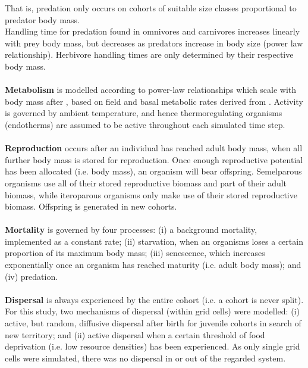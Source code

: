 That is, predation only occurs on cohorts of suitable size classes proportional to predator body mass.
\\
 Handling time for predation found in omnivores and carnivores increases linearly with prey body mass, but decreases as predators increase in body size (power law relationship). Herbivore handling times are only determined by their respective body mass. \\\\
\textbf{Metabolism} is modelled according to  power-law relationships which scale with body mass after \cite{Brown2004}, based on field and basal metabolic rates derived from \cite{Nagy1999}. 
 Activity is governed by ambient temperature, and hence thermoregulating organisms (endotherms) are assumed to be active throughout each simulated time step. 
\\\\
\textbf{Reproduction} occurs after an individual has reached adult body mass, when all further body mass is stored for reproduction. 
Once enough reproductive potential has been allocated (i.e. body mass), an organism will bear offspring. 
Semelparous organisms use all of their stored reproductive biomass and part of their adult biomass, while iteroparous organisms only make use of their stored reproductive biomass. Offspring is generated in new cohorts.
\\\\
\textbf{Mortality} is governed by four processes: (i) a background mortality, implemented as a constant rate; (ii) starvation, when an organisms loses a certain proportion of its maximum body mass;  (iii) senescence, which increases exponentially once an organism has reached maturity (i.e. adult body mass); and (iv) predation. \\\\
\textbf{Dispersal} is always experienced by the entire cohort (i.e. a cohort is never split). For this study, two mechanisms of dispersal (within grid cells) were modelled: (i) active, but random, diffusive dispersal after birth for juvenile cohorts in search of new territory; and (ii) active dispersal when a certain threshold of  food deprivation (i.e. low resource densities) has been experienced. As only single grid cells were simulated, there was no dispersal in or out of the regarded system.
 
%

